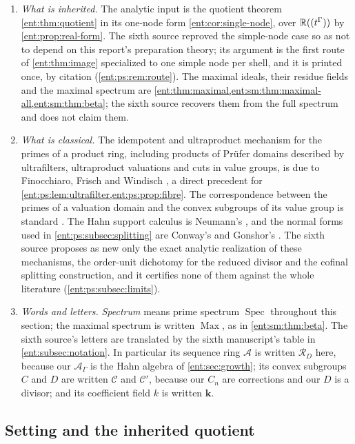\documentclass[11pt]{article}
\theoremstyle{plain}
\theoremstyle{plain}
\theoremstyle{plain}
\theoremstyle{definition}
\theoremstyle{definition}
\theoremstyle{definition}
\theoremstyle{definition}
\theoremstyle{remark}
\newcommand{\A}{\mathcal A_\Gamma}\newcommand{\OO}{\mathcal O_\Gamma}
\DeclareMathOperator{\Spec}{Spec}\DeclareMathOperator{\red}{red}
\newcommand{\RD}{\mathcal R_D}\newcommand{\Ucal}{\mathcal U}
\newcommand{\kk}{\mathbf k}\newcommand{\PP}{\mathbb P}
\begin{document}
\begin{enumerate}[label=(\arabic*),leftmargin=2em]
\item \emph{What is inherited.} The analytic input is the quotient theorem
\cref{ent:thm:quotient} in its one-node form \cref{ent:cor:single-node}, over
$\mathbb R((t^\Gamma))$ by \cref{ent:prop:real-form}. The sixth source reproved the
simple-node case so as not to depend on this report's preparation theory; its
argument is the first route of \cref{ent:thm:image} specialized to one simple
node per shell, and it is printed once, by citation
(\cref{ent:ps:rem:route}). The maximal ideals, their residue fields and the
maximal spectrum are \cref{ent:thm:maximal,ent:sm:thm:maximal-all,ent:sm:thm:beta};
the sixth source recovers them from the full spectrum and does not claim them.
\item \emph{What is classical.} The idempotent and ultraproduct mechanism for
the primes of a product ring, including products of Pr\"ufer domains described
by ultrafilters, ultraproduct valuations and cuts in value groups, is due to
Finocchiaro, Frisch and Windisch \cite{FFW}, a direct precedent for
\cref{ent:ps:lem:ultrafilter,ent:ps:prop:fibre}. The correspondence between
the primes of a valuation domain and the convex subgroups of its value group
is standard \cite{StacksValuation}. The Hahn support calculus is Neumann's
\cite{Neumann}, and the normal forms used in \cref{ent:ps:subsec:splitting}
are Conway's and Gonshor's \cite{Conway,Gonshor}. The sixth source proposes
as new only the exact analytic realization of these mechanisms, the
order-unit dichotomy for the reduced divisor and the cofinal splitting
construction, and it certifies none of them against the whole literature
(\cref{ent:ps:subsec:limits}).
\item \emph{Words and letters.} \emph{Spectrum} means prime spectrum
$\Spec$ throughout this section; the maximal spectrum is written
$\operatorname{Max}$, as in \cref{ent:sm:thm:beta}. The sixth source's
letters are translated by the sixth manuscript's table in
\cref{ent:subsec:notation}. In
particular its sequence ring $\mathcal A$ is written $\RD$ here, because our
$\A$ is the Hahn algebra of \cref{ent:sec:growth}; its convex subgroups $C$
and $D$ are written $\mathcal C$ and $\mathcal C'$, because our $C_n$ are
corrections and our $D$ is a divisor; and its coefficient field $k$ is
written $\kk$.
\end{enumerate}

\subsection{Setting and the inherited quotient}
\label{ent:ps:subsec:setting}
\end{document}
